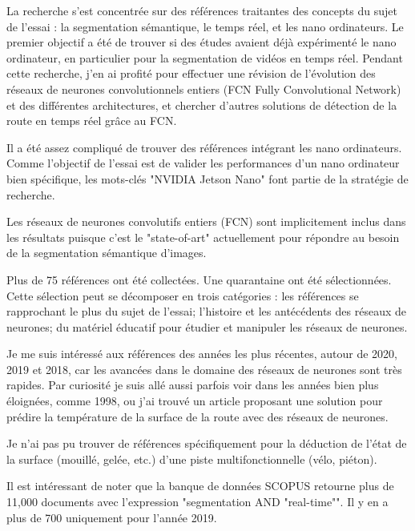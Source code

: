 ﻿\par La recherche s'est concentrée sur des références traitantes des concepts du sujet de l'essai : la segmentation sémantique, le temps réel, et les nano ordinateurs. Le premier objectif a été de trouver si des études avaient déjà expérimenté le nano ordinateur, en particulier pour la segmentation de vidéos en temps réel. Pendant cette recherche, j'en ai profité pour effectuer une révision de l'évolution des réseaux de neurones convolutionnels entiers (FCN Fully Convolutional Network)  et des différentes architectures, et chercher d'autres solutions de détection de la route en temps réel grâce au FCN. 
\par Il a été assez compliqué de trouver des références intégrant les nano ordinateurs. Comme l'objectif de l'essai est de valider les performances d'un nano ordinateur bien spécifique, les mots-clés "NVIDIA Jetson Nano" font partie de la stratégie de recherche. 
\par Les réseaux de neurones convolutifs entiers (FCN) sont implicitement inclus dans les résultats puisque c'est le "state-of-art" actuellement pour répondre au besoin de la segmentation sémantique d'images.
\par Plus de 75 références ont été collectées. Une quarantaine ont été sélectionnées. Cette sélection peut se décomposer en trois catégories : les références se rapprochant le plus du sujet de l'essai; l'histoire et les antécédents des réseaux de neurones; du matériel éducatif pour étudier et manipuler les réseaux de neurones.
\par Je me suis intéressé aux références des années les plus récentes, autour de 2020, 2019 et 2018, car les avancées dans le domaine des réseaux de neurones sont très rapides. Par curiosité je suis allé aussi parfois voir dans les années bien plus éloignées, comme 1998, ou j'ai trouvé un article proposant une solution pour prédire la température de la surface de la route avec des réseaux de neurones.
\par Je n'ai pas pu trouver de références spécifiquement pour la déduction de l'état de la surface (mouillé, gelée, etc.) d'une piste multifonctionnelle (vélo, piéton). 
\par Il est intéressant de noter que la banque de données SCOPUS retourne plus de 11,000 documents avec l'expression "segmentation AND "real-time"". Il y en a plus de 700 uniquement pour l'année 2019. 